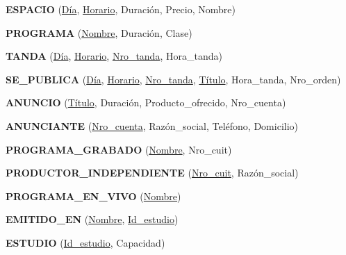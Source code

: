 \documentclass[a4paper,10pt]{article}
\begin{document}
    \begin{flushleft}
      {\bf{ESPACIO}} (\underline{D\'ia}, \underline{Horario}, Duraci\'on, Precio, Nombre)
    \end{flushleft} 
 
    \begin{flushleft}
      {\bf{PROGRAMA}} (\underline{Nombre}, Duraci\'on, Clase)
    \end{flushleft} 

    \begin{flushleft}
      {\bf{TANDA}} (\underline{D\'ia}, \underline{Horario}, \underline{Nro\_tanda}, Hora\_tanda)
    \end{flushleft} 

    \begin{flushleft}
      {\bf{SE\_PUBLICA}} (\underline{D\'ia}, \underline{Horario}, \underline{Nro\_tanda}, \underline{T\'itulo}, Hora\_tanda, Nro\_orden)    
    \end{flushleft}

    \begin{flushleft}
      {\bf{ANUNCIO}} (\underline{T\'itulo}, Duraci\'on, Producto\_ofrecido, Nro\_cuenta)
    \end{flushleft}

    \begin{flushleft}
      {\bf{ANUNCIANTE}} (\underline{Nro\_cuenta}, Raz\'on\_social, Tel\'efono, Domicilio)
    \end{flushleft}

    \begin{flushleft}
      {\bf{PROGRAMA\_GRABADO}} (\underline{Nombre}, Nro\_cuit)
    \end{flushleft}
   
    \begin{flushleft}
      {\bf{PRODUCTOR\_INDEPENDIENTE}} (\underline{Nro\_cuit}, Raz\'on\_social)
    \end{flushleft}
  
    \begin{flushleft}
      {\bf{PROGRAMA\_EN\_VIVO}} (\underline{Nombre})
    \end{flushleft}

    \begin{flushleft}
      {\bf{EMITIDO\_EN}} (\underline{Nombre}, \underline{Id\_estudio})
    \end{flushleft}
  
    \begin{flushleft}
      {\bf{ESTUDIO}} (\underline{Id\_estudio}, Capacidad)
    \end{flushleft}
  
\end{document}
